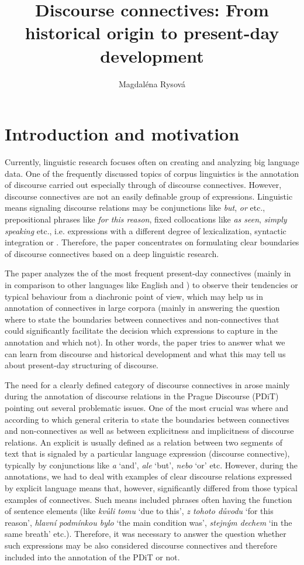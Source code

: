 \documentclass[output=paper]{langsci/langscibook.cls}
\author{Magdaléna Rysová \affiliation{Charles University, Faculty of Mathematics and Physics}}
\title{Discourse connectives: From historical origin to present-day development}
\begin{document}
	
\section{Introduction and motivation}

Currently, linguistic research focuses often on creating and analyzing big language data. One of the frequently discussed topics of corpus linguistics is the annotation of discourse carried out especially through  of discourse connectives. However, discourse connectives are not an easily definable group of expressions. Linguistic means signaling discourse relations may be conjunctions like \textit{but}, \textit{or} etc., prepositional phrases like \textit{for this reason}, fixed collocations like \textit{as seen}, \textit{simply speaking} etc., i.e. expressions with a different degree of lexicalization, syntactic integration or . Therefore, the paper concentrates on formulating clear boundaries of discourse connectives based on a deep linguistic research. 

The paper analyzes the  of the most frequent present-day connectives (mainly in  in comparison to other languages like English and ) to observe their tendencies or typical behaviour from a diachronic point of view, which may help us in annotation of connectives in large corpora (mainly in answering the question where to state the boundaries between connectives and non-connectives that could significantly facilitate the decision which expressions to capture in the annotation and which not). In other words, the paper tries to answer what we can learn from discourse  and historical development and what this may tell us about present-day structuring of discourse. 

The need for a clearly defined category of discourse connectives in  arose mainly during the annotation of discourse relations in the Prague Discourse  (PDiT) pointing out several problematic issues. One of the most crucial was where and according to which general criteria to state the boundaries between connectives and non-connectives as well as between explicitness and implicitness of discourse relations. An explicit  is usually defined as a relation between two segments of text that is signaled by a particular language expression (discourse connective), typically by conjunctions like \textit{a} `and', \textit{ale }`but', \textit{nebo} `or' etc. However, during the annotations, we had to deal with examples of clear discourse relations expressed by explicit language means that, however, significantly differed from those typical examples of connectives. Such means included  phrases often having the function of sentence elements (like \textit{kvůli tomu }`due to this', \textit{z tohoto důvodu} `for this reason', \textit{hlavní podmínkou bylo} `the main condition was', \textit{stejným dechem} `in the same breath' etc.). Therefore, it was necessary to answer the question whether such expressions may be also considered discourse connectives and therefore included into the annotation of the PDiT or not.
\end{document}
